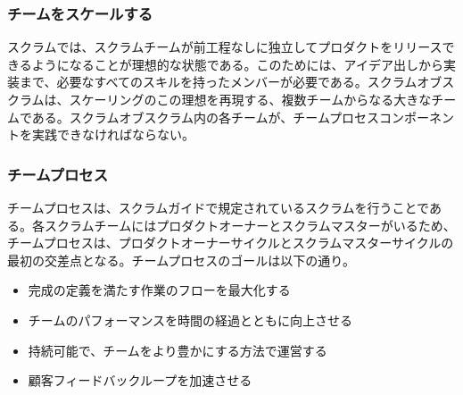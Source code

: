 \documentclass[12pt,a4paper,parskip=full]{scrartcl}
\begin{document}

\subsubsection{チームをスケールする}\label{scaling-the-teams}

スクラムでは、スクラムチームが前工程なしに独立してプロダクトをリリースできるようになることが理想的な状態である。このためには、アイデア出しから実装まで、必要なすべてのスキルを持ったメンバーが必要である。スクラムオブスクラムは、スケーリングのこの理想を再現する、複数チームからなる大きなチームである。スクラムオブスクラム内の各チームが、チームプロセスコンポーネントを実践できなければならない。

\subsubsection{チームプロセス}\label{the-team-process}

チームプロセスは、スクラムガイドで規定されているスクラムを行うことである。各スクラムチームにはプロダクトオーナーとスクラムマスターがいるため、チームプロセスは、プロダクトオーナーサイクルとスクラムマスターサイクルの最初の交差点となる。チームプロセスのゴールは以下の通り。
\begin{itemize}
\itemsep1pt\parskip0pt

\item
完成の定義を満たす作業のフローを最大化する
\item
チームのパフォーマンスを時間の経過とともに向上させる
\item
持続可能で、チームをより豊かにする方法で運営する
\item
顧客フィードバックループを加速させる
\end{itemize}
\end{document}
